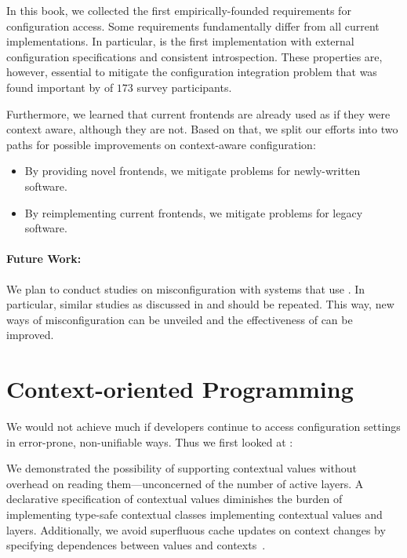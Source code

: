 In this book, we collected the first empirically-founded requirements for configuration access.
Some requirements fundamentally differ from all current implementations.
In particular,  is the first implementation with external configuration specifications and consistent introspection.
These properties are, however, essential to mitigate the configuration integration problem that was found important by  of $173$ survey participants.

Furthermore, we learned that current frontends are already used as if they were context aware, although they are not.
Based on that, we split our efforts into two paths for possible improvements on context-aware configuration:
\begin{itemize}
\item By providing novel frontends, we mitigate problems for newly-written software.
\item By reimplementing current frontends, we mitigate problems for legacy software.
\end{itemize}

\paragraph{Future Work:}
We plan to conduct studies on misconfiguration with systems that use \elektra{}.
In particular, similar studies as discussed in  and  should be repeated.
This way, new ways of misconfiguration can be unveiled and the effectiveness of \elektra{} can be improved.










\section{Context-oriented Programming}
\label{sec:conclusion-programming}

We would not achieve much if developers continue to access configuration settings in error-prone, non-unifiable ways.
Thus we first looked at :
\goalFrontends*

We demonstrated the possibility of supporting contextual values without overhead on reading them---unconcerned of the number of active layers.
A declarative specification of contextual values diminishes the burden of implementing type-safe contextual classes implementing contextual values and layers.
Additionally, we avoid superfluous cache updates on context changes by specifying dependences between values and contexts~\cite{raab2014program}.


